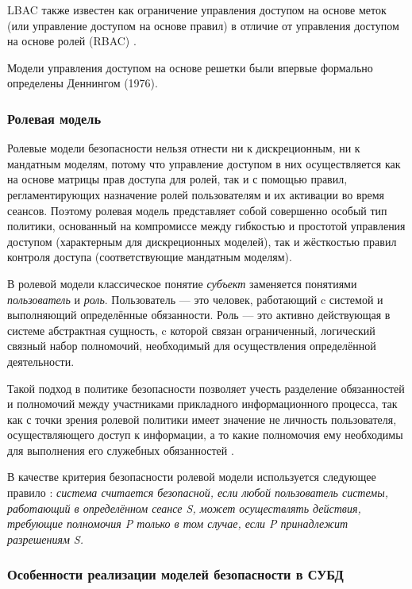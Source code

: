 LBAC также известен как ограничение управления доступом на основе меток (или управление доступом на основе правил)
в отличие от управления доступом на основе ролей (RBAC) \autocite{LBAC}.

Модели управления доступом на основе решетки были впервые формально определены Деннингом (1976).

\subsubsection{Ролевая модель}

Ролевые модели безопасности нельзя отнести ни к дискреционным, ни к мандатным моделям, потому что
управление доступом в них осуществляется как на основе матрицы прав доступа для ролей, так и с помощью
правил, регламентирующих назначение ролей пользователям и их активации во время сеансов. Поэтому
ролевая модель представляет собой совершенно особый тип политики, основанный на компромиссе между
гибкостью и простотой управления доступом (характерным для дискреционных моделей), так и жёсткостью
правил контроля доступа (соответствующие мандатным моделям).

В ролевой модели классическое понятие \textit{субъект} заменяется понятиями \textit{пользователь} и
\textit{роль}. Пользователь --- это человек, работающий c системой и выполняющий определённые
обязанности. Роль --- это активно действующая в системе абстрактная сущность, c которой связан
ограниченный, логический связный набор полномочий, необходимый для осуществления определённой деятельности.

Такой подход в политике безопасности позволяет учесть разделение обязанностей и полномочий между
участниками прикладного информационного процесса, так как с точки зрения ролевой политики имеет
значение не личность пользователя, осуществляющего доступ к информации, а то какие полномочия ему
необходимы для выполнения его служебных обязанностей \autocite{Zegzhda}.

В качестве критерия безопасности ролевой модели используется следующее правило \autocite{Zegzhda}:
\textit{система считается безопасной, если любой пользователь системы, работающий в определённом
сеансе S, может осуществлять действия, требующие полномочия P только в том случае, если P принадлежит
разрешениям S.}

\subsubsection{Особенности реализации моделей безопасности в СУБД}

